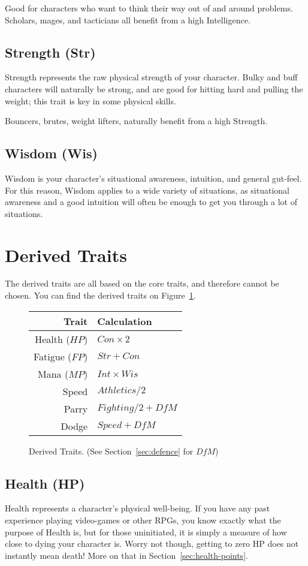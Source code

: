 Good for characters who want to think their way out of and around problems.
Scholars, mages, and tacticians all benefit from a high Intelligence.

\subsection{Strength (Str)}
Strength represents the raw physical strength of your character.
Bulky and buff characters will naturally be strong, and are good for hitting hard and pulling the weight; this trait is key in some physical skills.

Bouncers, brutes, weight lifters, naturally benefit from a high Strength.

\subsection{Wisdom (Wis)}
Wisdom is your character's situational awareness, intuition, and general gut-feel.
For this reason, Wisdom applies to a wide variety of situations, as situational awareness and a good intuition will often be enough to get you through a lot of situations.

\section{Derived Traits}
The derived traits are all based on the core traits, and therefore cannot be chosen. 
You can find the derived traits on Figure~\ref{fig:derived_traits}.

\begin{figure}[!ht]
    \centering
\begin{tabular}{r | l}
    \textbf{Trait} & \textbf{Calculation} \\\hline
    Health  ($HP$) & $Con\times 2$ \\
    Fatigue ($FP$) & $Str + Con$ \\
    Mana    ($MP$) & $Int\times Wis$ \\
    Speed          & $Athletics / 2$\\
    Parry          & $Fighting/2 + \mathit{DfM}$\\
    Dodge          & $Speed + \mathit{DfM}$
\end{tabular}
    \caption{Derived Traits. (See Section~\ref{sec:defence} for $\mathit{DfM}$)}
    \label{fig:derived_traits}
\end{figure}

\subsection{Health (HP)}
Health represents a character's physical well-being.
If you have any past experience playing video-games or other RPGs, you know exactly what the purpose of Health is, but for those uninitiated, it is simply a measure of how close to dying your character is.
Worry not though, getting to zero HP does not instantly mean death!
More on that in Section~\ref{sec:health-points}.

